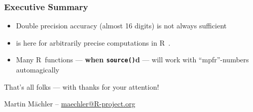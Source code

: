 \documentclass[dvipsnames,pdflatex,beamer]{beamer}
\newcommand{\Rp}{\textsf{R}}
\renewcommand{\R}{\Rp\ }
\begin{document}
\begin{frame}\frametitle{Executive Summary}
\begin{itemize}%
 \item Double precision accuracy (almost 16 digits) is not always sufficient
 \item {} is here for arbitrarily precise computations in \R.
 \item Many \R functions --- \textbf{when \texttt{source()}d} --- will work
   with ``mpfr''-numbers automagically
   \end{itemize}

\pause

\bigskip

\begin{block}{}
   That's all folks --- with thanks for your attention!
\end{block}
\bigskip

\begin{center}
  Martin M\"achler -- \url{maechler@R-project.org}
\end{center}

\end{frame}
\end{document}
